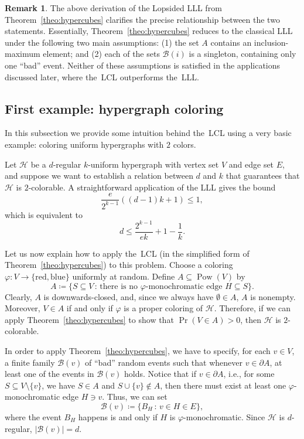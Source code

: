 \documentclass[10pt]{article}
\numberwithin{equation}{subsection}
\theoremstyle{definition}
\newtheorem{remk}[theo]{Remark}
\newcommand{\powerset}[1]{\operatorname{Pow}(#1)}
\begin{document}
	\begin{remk}
		The above derivation of the Lopsided LLL from Theorem~\ref{theo:hypercubes} clarifies the precise relationship between the two statements. Essentially, Theorem~\ref{theo:hypercubes} reduces to the classical LLL under the following two main assumptions: (1) the set $A$ contains an inclusion-maximum element; and (2) each of the sets $\mathcal{B}(i)$ is a singleton, containing only one ``bad'' event. Neither of these assumptions is satisfied in the applications discussed later, where the~LCL outperforms the~LLL.
	\end{remk}
	
	\subsection{First example: hypergraph coloring}\label{subsec:hypcol}
	
	In this subsection we provide some intuition behind the~LCL using a very basic example: coloring uniform hypergraphs with $2$ colors.
	
	Let $\mathcal{H}$ be a $d$-regular $k$-uniform hypergraph with vertex set $V$ and edge set $E$, and suppose we want to establish a relation between $d$ and $k$ that guarantees that $\mathcal{H}$ is $2$-colorable. A straightforward application of the LLL gives the bound
	$$
	\frac{e}{2^{k-1}}((d-1)k+1) \leq 1,
	$$
	which is equivalent to
	\begin{equation}\label{eq:hypcolLLL}
	d \leq \frac{2^{k-1}}{ek} +1 - \frac{1}{k}.
	\end{equation}
	
	Let us now explain how to apply the~LCL (in the simplified form of Theorem~\ref{theo:hypercubes}) to this problem. Choose a coloring $\varphi \colon V \to \{\text{red}, \text{blue}\}$ uniformly at random. Define $A \subseteq \powerset{V}$ by
	$$
	A \coloneqq \{ S \subseteq V\,:\, \text{there is no $\varphi$-monochromatic edge $H \subseteq S$}\}.
	$$
	Clearly, $A$ is downwards-closed, and, since we always have $\emptyset \in A$, $A$ is nonempty. Moreover, $V \in A$ if and only if $\varphi$ is a proper coloring of $\mathcal{H}$. Therefore, if we can apply Theorem~\ref{theo:hypercubes} to show that $\Pr(V \in A) > 0$, then $\mathcal{H}$ is $2$-colorable.
	
	In order to apply Theorem~\ref{theo:hypercubes}, we have to specify, for each $v \in V$, a finite family $\mathcal{B}(v)$ of ``bad'' random events such that whenever $v \in \partial A$, at least one of the events in $\mathcal{B}(v)$ holds. Notice that if $v \in \partial A$, i.e., for some $S \subseteq V \setminus \{v\}$, we have $S \in A$ and $S \cup \{v\} \not \in A$, then there must exist at least one $\varphi$-monochromatic edge $H \ni v$. Thus, we can set
	$$
		\mathcal{B}(v) \coloneqq \{B_H \,:\, v \in H \in E\},
	$$
	where the event $B_H$ happens is and only if $H$ is $\varphi$-monochromatic. Since $\mathcal{H}$ is $d$-regular, $|\mathcal{B}(v)| = d$.
	
\end{document}
